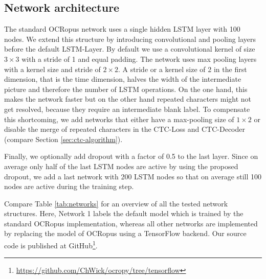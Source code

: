 \documentclass{jlcl}
\begin{document}
\subsection{Network architecture}
The standard OCRopus network uses a single hidden LSTM layer with 100 nodes.
We extend this structure by introducing convolutional and pooling layers before the default LSTM-Layer.
By default we use a convolutional kernel of size $3 \times 3$ with a stride of 1 and equal padding.
The network uses max pooling layers with a kernel size and stride of $2\times2$.
A stride or a kernel size of 2 in the first dimension, that is the time dimension, halves the width of the intermediate picture and therefore the number of LSTM operations.
On the one hand, this makes the network faster but on the other hand repeated characters might not get resolved, because they require an intermediate blank label.
To compensate this shortcoming, we add networks that either have a max-pooling size of $1 \times 2$ or disable the merge of repeated characters in the CTC-Loss and CTC-Decoder (compare Section \ref{sec:ctc-algorithm}).

Finally, we optionally add dropout with a factor of 0.5 to the last layer.
Since on average only half of the last LSTM nodes are active by using the proposed dropout, we add a last network with 200 LSTM nodes so that on average still 100 nodes are active during the training step.

Compare Table \ref{tab:networks} for an overview of all the tested network structures.
Here, Network 1 labels the default model which is trained by the standard OCRopus implementation, whereas all other networks are implemented by replacing the model of OCRopus using a TensorFlow backend.
Our source code is published at GitHub\footnote{\url{https://github.com/ChWick/ocropy/tree/tensorflow}}.
\end{document}
